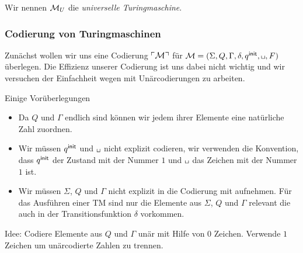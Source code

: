 Wir nennen $\mathcal{M}_U$ die \emph{universelle Turingmaschine}.

\subsubsection{Codierung von Turingmaschinen}

Zunächst wollen wir uns eine Codierung $\ulcorner \mathcal{M} \urcorner$ für $\mathcal{\M}=(\Sigma, Q, \Gamma, \delta, \qinit, \blank, F)$ überlegen.
Die Effizienz unserer Codierung ist uns dabei nicht wichtig und wir versuchen der Einfachheit wegen mit Unärcodierungen zu arbeiten.

Einige Vorüberlegungen
\begin{itemize}
 \item Da $Q$ und $\Gamma$ endlich sind können wir jedem ihrer Elemente eine natürliche Zahl zuordnen.
 \item Wir müssen $q^\mathsf{init}$ und $\blank$ nicht explizit codieren, wir verwenden die Konvention, 
 dass $q^\mathsf{init}$ der Zustand mit der Nummer $1$ und $\blank$ das Zeichen mit der Nummer $1$ ist.
 \item Wir müssen $\Sigma$, $Q$ und $\Gamma$ nicht explizit in die Codierung mit aufnehmen.
 Für das Ausführen einer \ac{TM} sind nur die Elemente aus $\Sigma$, $Q$ und $\Gamma$ relevant die auch in der Transitionsfunktion $\delta$ vorkommen.
\end{itemize}

Idee: Codiere Elemente aus $Q$ und $\Gamma$ unär mit Hilfe von $0$ Zeichen.
Verwende $1$ Zeichen um unärcodierte Zahlen zu trennen.

